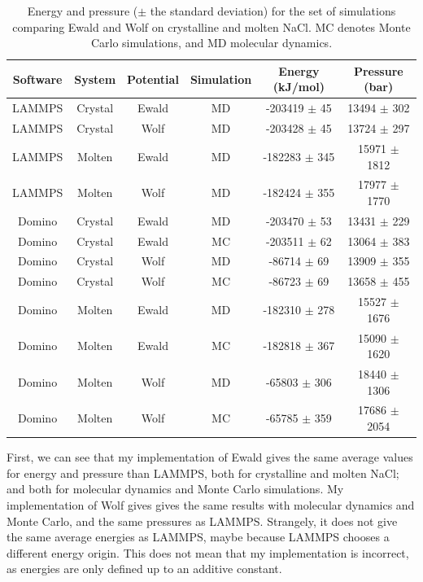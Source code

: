 \documentclass[thesis]{subfiles}
\begin{document}
\begin{table}[ht]
    \caption{Energy and pressure ($\pm$ the standard deviation) for the set of
    simulations comparing Ewald and Wolf on crystalline and molten NaCl. MC
    denotes Monte Carlo simulations, and MD molecular dynamics.}
    \label{tab:ewald-vs-wolf}
    \begin{tabular}{c c c c c c}
        \toprule
        Software & System  & Potential & Simulation & Energy (\si{kJ/mol}) & Pressure (bar) \\
        \midrule
        LAMMPS   & Crystal &    Ewald  &    MD      & -203419 $\pm$ 45  & 13494 $\pm$ 302  \\
        LAMMPS   & Crystal &    Wolf   &    MD      & -203428 $\pm$ 45  & 13724 $\pm$ 297  \\
        LAMMPS   & Molten  &    Ewald  &    MD      & -182283 $\pm$ 345 & 15971 $\pm$ 1812 \\
        LAMMPS   & Molten  &    Wolf   &    MD      & -182424 $\pm$ 355 & 17977 $\pm$ 1770 \\
        \midrule
        Domino   & Crystal &    Ewald  &    MD      & -203470 $\pm$ 53 & 13431 $\pm$ 229 \\
        Domino   & Crystal &    Ewald  &    MC      & -203511 $\pm$ 62 & 13064 $\pm$ 383 \\
        Domino   & Crystal &    Wolf   &    MD      & -86714 $\pm$ 69 & 13909 $\pm$ 355 \\
        Domino   & Crystal &    Wolf   &    MC      & -86723 $\pm$ 69 & 13658 $\pm$ 455 \\
        Domino   & Molten  &    Ewald  &    MD      & -182310 $\pm$ 278 & 15527 $\pm$ 1676 \\
        Domino   & Molten  &    Ewald  &    MC      & -182818 $\pm$ 367 & 15090 $\pm$ 1620 \\
        Domino   & Molten  &    Wolf   &    MD      & -65803 $\pm$ 306 & 18440 $\pm$ 1306 \\
        Domino   & Molten  &    Wolf   &    MC      & -65785 $\pm$ 359 & 17686 $\pm$ 2054 \\
        \bottomrule
    \end{tabular}
\end{table}

First, we can see that my implementation of Ewald gives the same average values
for energy and pressure than LAMMPS, both for crystalline and molten NaCl; and
both for molecular dynamics and Monte Carlo simulations. My implementation of
Wolf gives gives the same results with molecular dynamics and Monte Carlo, and
the same pressures as LAMMPS. Strangely, it does not give the same average
energies as LAMMPS, maybe because LAMMPS chooses a different energy origin.
This does not mean that my implementation is incorrect, as energies are only
defined up to an additive constant.
\end{document}
